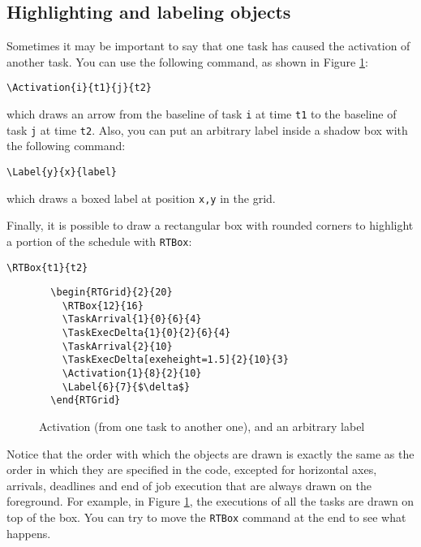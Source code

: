 \documentclass{article}
\begin{document}
\subsection{Highlighting and labeling objects}

Sometimes it may be important to say that one task has caused the
activation of another task. You can use the following command, as
shown in Figure \ref{fig:ex3a}:
\begin{verbatim}
\Activation{i}{t1}{j}{t2}
\end{verbatim}
which draws an arrow from the baseline of task \texttt{i} at time
\texttt{t1} to the baseline of task \texttt{j} at time \texttt{t2}.
Also, you can put an arbitrary label inside a shadow box with the
following command:
\begin{verbatim}
\Label{y}{x}{label}
\end{verbatim}
which draws a boxed label at position \texttt{x,y} in the grid.

Finally, it is possible to draw a rectangular box with rounded corners
to highlight a portion of the schedule with \texttt{RTBox}:
\begin{verbatim}
\RTBox{t1}{t2}
\end{verbatim}

\begin{figure}[!htbp]
  \centering
  \begin{RTGrid}{2}{20}
  \end{RTGrid}
\begin{verbatim}
  \begin{RTGrid}{2}{20}
    \RTBox{12}{16}
    \TaskArrival{1}{0}{6}{4}
    \TaskExecDelta{1}{0}{2}{6}{4}
    \TaskArrival{2}{10}
    \TaskExecDelta[exeheight=1.5]{2}{10}{3}
    \Activation{1}{8}{2}{10}
    \Label{6}{7}{$\delta$}
  \end{RTGrid}
\end{verbatim}
  \caption{Activation (from one task to another one), and an arbitrary label}
  \label{fig:ex3a}
\end{figure}

Notice that the order with which the objects are drawn is exactly the
same as the order in which they are specified in the code, excepted 
for horizontal axes, arrivals, deadlines and end of job execution that are always drawn on the foreground. 
For example, in Figure \ref{fig:ex3a}, the executions of all the tasks are
drawn on top of the box. You can try to move the \texttt{RTBox}
command at the end to see what happens.
\end{document}
